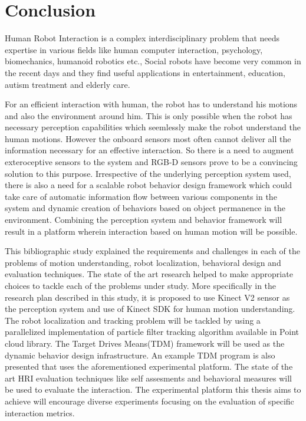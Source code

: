 
\chapter{Conclusion} %
\label{Chapter8} %
	Human Robot Interaction is a complex interdisciplinary problem that needs expertise in various fields like human computer interaction, psychology, biomechanics, humanoid robotics etc., Social robots have become very common in the recent days and they find useful applications in entertainment, education, autism treatment and elderly care. 
	
	For an efficient interaction with human, the robot has to understand his motions and also the environment around him. This is only possible when the robot has necessary perception capabilities which seemlessly make the robot understand the human motions. However the onboard sensors most often cannot deliver all the information necessary for an effective interaction. So there is a need to augment exteroceptive sensors to the system and RGB-D sensors prove to be a convincing solution to this purpose. Irrespective of the underlying perception system used, there is also a need for a scalable robot behavior design framework which could take care of automatic information flow between various components in the system and dynamic creation of behaviors based on object permanence in the environment. Combining the perception system and behavior framework will result in a platform wherein interaction based on human motion will be possible. 
	
	This bibliographic study explained the requirements and challenges in each of the problems of motion understanding, robot localization, behavioral design and evaluation techniques. The state of the art research helped to make appropriate choices to tackle each of the problems under study. More specifically in the research plan described in this study, it is proposed to use Kinect V2 sensor as the perception system and use of Kinect SDK for human motion understanding. The robot localization and tracking problem will be tackled by using a parallelized implementation of particle filter tracking algorithm available in Point cloud library. The Target Drives Means(TDM) framework will be used as the dynamic behavior design infrastructure. An example TDM program is also presented that uses the aforementioned experimental platform. The state of the art HRI evaluation techniques like self assesments and behavioral measures will be used to evaluate the interaction. The experimental platform this thesis aims to achieve will encourage diverse experiments focusing on the evaluation of specific interaction metrics.